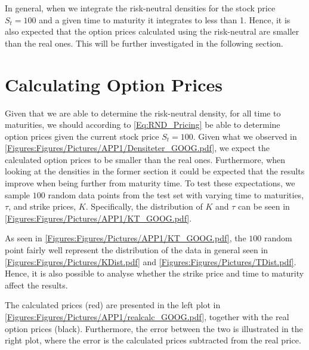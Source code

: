 In general, when we integrate the risk-neutral densities for the stock price $S_t=100$ and a given time to maturity it integrates to less than 1. Hence, it is also expected that the option prices calculated using the risk-neutral are smaller than the real ones. This will be further investigated in the following section. 


\section{Calculating Option Prices}\label{Sec.App:Calculating_Option_Prices}
Given that we are able to determine the risk-neutral density, for all time to maturities, we should according to \eqref{Eq:RND_Pricing} be able to determine option prices given the current stock price $S_t=100$. Given what we observed in \autoref{Figures:Figures/Pictures/APP1/Densiteter_GOOG.pdf}, we expect the calculated option prices to be smaller than the real ones. Furthermore, when looking at the densities in the former section it could be expected that the results improve when being further from maturity time. To test these expectations, we sample $100$ random data points from the test set with varying time to maturities, $\tau$, and strike prices, $K$. Specifically, the distribution of $K$ and $\tau$ can be seen in \autoref{Figures:Figures/Pictures/APP1/KT_GOOG.pdf}. 


As seen in \autoref{Figures:Figures/Pictures/APP1/KT_GOOG.pdf}, the $100$ random point fairly well represent the distribution of the data in general seen in \autoref{Figures:Figures/Pictures/KDist.pdf} and \autoref{Figures:Figures/Pictures/TDist.pdf}. Hence, it is also possible to analyse whether the strike price and time to maturity affect the results. 

The calculated prices (red) are presented in the left plot in \autoref{Figures:Figures/Pictures/APP1/realcalc_GOOG.pdf}, together with the real option prices (black). Furthermore, the error between the two is illustrated in the right plot, where the error is the calculated prices subtracted from the real price. 



